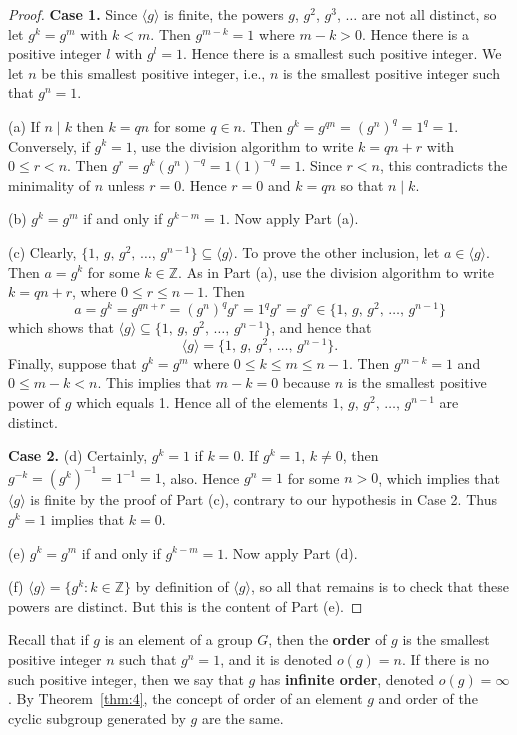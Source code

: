 \documentclass[11pt]{article}
\newcommand{\Z} {{\mathbb Z}}
\newcommand{\divides}{\ensuremath{\mid}}
\newcommand{\<}{\ensuremath{\langle}}
\renewcommand{\>}{\ensuremath{\rangle}}
\theoremstyle{plain}
\theoremstyle{definition}
\begin{document}
\begin{proof}  {\bf Case 1.} Since $\langle g\rangle $ is finite, the powers
$g$, $g^2$, $g^3$, $\ldots$ are not all distinct, so let $g^k=g^m$
with $k<m$.  Then $g^{m-k} =1$ where $m-k>0$.  Hence there is a
positive integer $l$ with $g^l=1$.  Hence there is a smallest such
positive integer.  We let $n$ be this smallest positive integer,
i.e., $n$ is the smallest positive integer such that $g^n=1$.

(a)  If $n\divides k$ then $k=qn$ for some $q\in n$.  Then
$g^k=g^{qn}=(g^n)^q=1^q=1$.   Conversely, if $g^k=1$, use the
division algorithm to write $k=qn+r$ with $0\le r<n$.  Then
$g^r=g^k(g^n)^{-q} = 1(1)^{-q} =1$.  Since $r<n$, this contradicts
the minimality of $n$ unless $r=0$.  Hence $r=0$ and $k=qn$ so
that $n\divides k$.

(b)  $g^k=g^m$ if and only if $g^{k-m} = 1$.  Now apply Part (a).

(c)  Clearly, $\{1,\, g,\, g^2,\, \ldots,\, g^{n-1}\} \subseteq
\langle g\rangle$.   To prove the other inclusion, let $a\in
\langle g\rangle$.  Then $a=g^k$ for some $k\in \Z$.  As in Part
(a), use the division algorithm to write $k=qn+r$, where $0\le
r\le n-1$.  Then
$$a=g^k=g^{qn+r}=(g^n)^qg^r=1^qg^r=g^r\in \{1,\, g,\, g^2,\, \ldots,\, g^{n-1}\}$$
which shows  that $\langle g\rangle \subseteq \{1,\, g,\, g^2,\,
\ldots,\, g^{n-1}\}$, and hence that
$$\langle g\rangle = \{1,\, g,\, g^2,\, \ldots,\, g^{n-1}\}.$$
Finally, suppose that $g^k=g^m$ where $0\le k\le m\le n-1$.   Then
$g^{m-k} =1$ and $0\le m-k <n$.  This implies that $m-k=0$ because
$n$ is the smallest positive power of $g$ which equals 1.  Hence
all of the elements $1,\, g,\, g^2,\, \ldots,\, g^{n-1}$ are
distinct.

{\bf Case 2.}  (d)  Certainly,  $g^k=1$ if $k=0$.  If $g^k=1$,
$k\ne 0$, then $g^{-k} = (g^k)^{-1} = 1^{-1} = 1$, also.  Hence
$g^n=1$ for some $n>0$, which implies that $\langle g\rangle$ is
finite by the proof of Part (c), contrary to our hypothesis in
Case 2.  Thus $g^k=1$ implies that $k=0$.

(e)  $g^k=g^m$ if and only if $g^{k-m} =1$.  Now apply Part (d).

(f)  $\langle g\rangle =\{g^k: k\in \Z\}$  by definition of
$\langle g\rangle$, so all that remains is to check that these
powers are distinct.  But this is the content of Part (e).
\end{proof}

Recall that if $g$ is an element of a  group $G$, then the {\bf
order} of $g$ is the smallest positive integer $n$ such that
$g^n=1$, and it is denoted $o(g)=n$.  If there is no such positive
integer, then we say that $g$ has {\bf infinite order}, denoted
$o(g)=\infty$.  By Theorem~\ref{thm:4}, the concept of order of an element
$g$ and order of the cyclic subgroup generated by $g$ are the
same.
\end{document}
